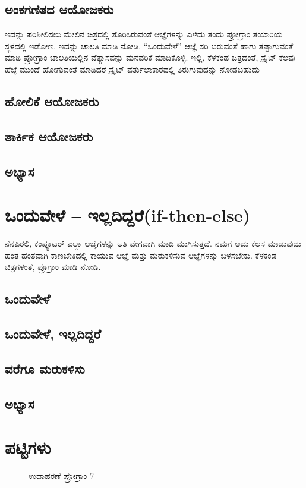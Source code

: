 \documentclass[16pt]{book}
\begin{document}
\section{ಅಂಕಗಣಿತದ ಆಯೋಜಕರು}
ಇದನ್ನು ಪರಿಶೀಲಿಸಲು ಮೇಲಿನ ಚಿತ್ರದಲ್ಲಿ ತೊರಿಸಿರುವಂತೆ ಆಜ್ಞೆಗಳನ್ನು ಎಳೆದು ತಂದು ಪ್ರೋಗ್ರಾಂ ತಯಾರಿಯ ಸ್ಥಳದಲ್ಲಿ ಇಡೋಣ. ಇದನ್ನು ಚಾಲತಿ ಮಾಡಿ ನೋಡಿ. “ಒಂದುವೇಳೆ” ಆಜ್ಞೆ ಸರಿ ಬರುವಂತೆ ಹಾಗು ತಪ್ಪಾಗುವಂತೆ ಮಾಡಿ ಪ್ರೋಗ್ರಾಂ ಚಾಲತಿಯಲ್ಲಿನ ವೆತ್ಯಾಸವನ್ನು ಮನವರಿಕೆ ಮಾಡಿಕೊಳ್ಳಿ. ಇಲ್ಲಿ, ಕೆಳಕಂಡ ಚಿತ್ರದಂತೆ, ಸ್ಪ್ರೈಟ್ ಕೆಲವು ಹೆಜ್ಜೆ ಮುಂದೆ ಹೋಗುವಂತೆ ಮಾಡಿದರೆ ಸ್ಪ್ರೈಟ್ ವರ್ತುಲಾಕಾರದಲ್ಲಿ ತಿರುಗುವುದನ್ನು ನೋಡಬಹುದು

\section{ಹೋಲಿಕೆ ಆಯೋಜಕರು}


\section{ತಾರ್ಕಿಕ ಆಯೋಜಕರು}

\section{ಅಭ್ಯಾಸ }

\chapter{ಒಂದುವೇಳೆ – ಇಲ್ಲದಿದ್ದರೆ(\textenglish{if-then-else})}
ನೆನಪಿರಲಿ, ಕಂಪ್ಯೂಟರ್ ಎಲ್ಲಾ ಆಜ್ಞೆಗಳನ್ನು ಅತಿ ವೇಗವಾಗಿ ಮಾಡಿ ಮುಗಿಸುತ್ತದೆ. ನಮಗೆ ಅದು ಕೆಲಸ ಮಾಡುವುದು ಹಂತ ಹಂತವಾಗಿ ಕಾಣಬೇಕಿದಲ್ಲಿ ಕಾಯುವ ಆಜ್ಞೆ ಮತ್ತು ಮರುಕಳಿಸುವ ಆಜ್ಞೆಗಳನ್ನು ಬಳಸಬೇಕು. ಕೆಳಕಂಡ ಚಿತ್ರಗಳಂತೆ, ಪ್ರೊಗ್ರಾಂ ಮಾಡಿ ನೋಡಿ. 
\section{ಒಂದುವೇಳೆ}

\section{ಒಂದುವೇಳೆ, ಇಲ್ಲದಿದ್ದರೆ}

\section{ವರೆಗೂ ಮರುಕಳಿಸು} 

\section{ಅಭ್ಯಾಸ }

\chapter{ಪಟ್ಟಿಗಳು}
\begin{figure}[h]
\begin{Scratch}[1]
\beginbox{}
\end{Scratch}
\caption{ಉದಾಹರಣೆ ಪ್ರೋಗ್ರಾಂ 7}
\end{figure}
\end{document}
